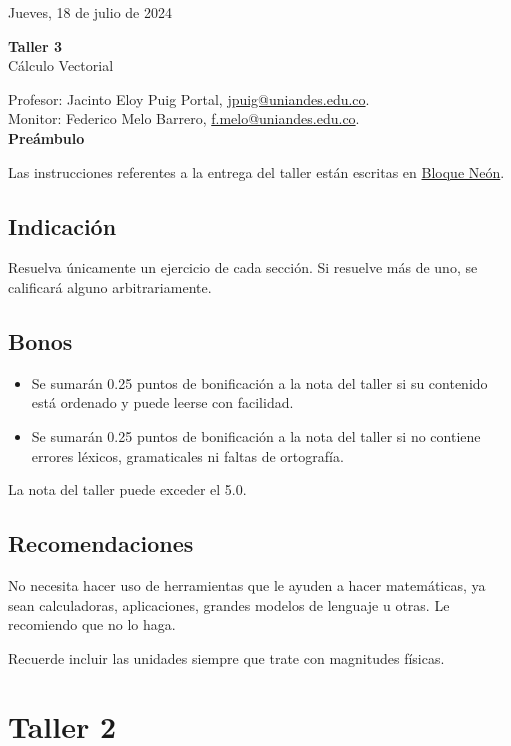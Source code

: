 \documentclass{fmbvecto}
\renewcommand{\title}{Taller 3}
\newcommand{\subject}{Cálculo Vectorial}
\begin{document}
Jueves, 18 de julio de 2024

\begin{center}
    \textbf{\LARGE \title} \\
    {\large \subject}
\end{center}


Profesor: Jacinto Eloy Puig Portal, \href{mailto:jpuig@uniandes.edu.co}{jpuig@uniandes.edu.co}. \\
Monitor: Federico Melo Barrero, \href{mailto:f.melo@uniandes.edu.co}{f.melo@uniandes.edu.co}.\\

\textbf{\Large Preámbulo}

Las instrucciones referentes a la entrega del taller están escritas en \href{https://bloqueneon.uniandes.edu.co/d2l/home}{Bloque Neón}.

\subsection*{Indicación}

Resuelva únicamente un ejercicio de cada sección. Si resuelve más de uno, se calificará alguno arbitrariamente.

\subsection*{Bonos}
\begin{itemize}
  \item Se sumarán 0.25 puntos de bonificación a la nota del taller si su contenido está ordenado y puede leerse con facilidad.
  \item Se sumarán 0.25 puntos de bonificación a la nota del taller si no contiene errores léxicos, gramaticales ni faltas de ortografía.
\end{itemize}
La nota del taller puede exceder el 5.0.

\subsection*{Recomendaciones}

No necesita hacer uso de herramientas que le ayuden a hacer matemáticas, ya sean calculadoras, aplicaciones, grandes modelos de lenguaje u otras. Le recomiendo que no lo haga.

Recuerde incluir las unidades siempre que trate con magnitudes físicas.


\section{Taller 2}
\end{document}
